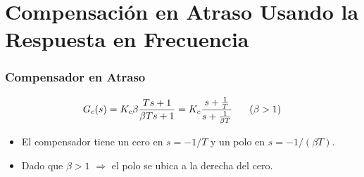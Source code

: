 \documentclass[aspectratio=169, handout]{beamer}
\theoremstyle{definition}
\theoremstyle{plain}
\theoremstyle{remark}
\begin{document}
\section{Compensación en Atraso Usando la Respuesta en Frecuencia}
\begin{frame}[<+->]\frametitle{Compensador en Atraso}
	\begin{equation*}
		G_c(s) = K_c \beta \frac{T s + 1}{\beta T s + 1} = K_c \frac{s+\frac{1}{T}}{s + \frac{1}{\beta T}}\hspace*{6mm} (\beta > 1)
	\end{equation*}
	\pause
	\begin{itemize}
		\item El compensador tiene un cero en $s = -1/T$ y un polo en $s = -1/(\beta T)$.
		\item Dado que $\beta > 1$ $\Rightarrow$ el polo se ubica a la derecha del cero.
	\end{itemize}
\end{frame}

 
\end{document}

